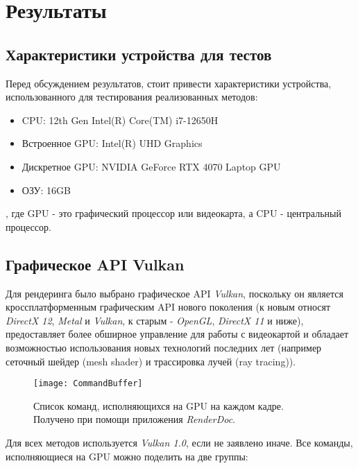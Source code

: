 
\section{Результаты}
\label{sec:Chapter4} 

\subsection{Характеристики устройства для тестов}

Перед обсуждением результатов, стоит привести характеристики устройства, использованного для тестирования реализованных методов:

\begin{itemize}
    \item CPU: 12th Gen Intel(R) Core(TM) i7-12650H
    \item Встроенное GPU: Intel(R) UHD Graphics
    \item Дискретное GPU: NVIDIA GeForce RTX 4070 Laptop GPU
    \item ОЗУ: 16GB
\end{itemize}
, где GPU - это графический процессор или видеокарта, а CPU - центральный процессор.

\subsection{Графическое API Vulkan}

Для рендеринга было выбрано графическое API \textit{Vulkan}, поскольку он является кроссплатформенным графическим API нового поколения (к новым относят \textit{DirectX 12}, \textit{Metal} и \textit{Vulkan}, к старым - \textit{OpenGL}, \textit{DirectX 11} и ниже), предоставляет более обширное управление для работы с видеокартой и обладает возможностью использования новых технологий последних лет (например сеточный шейдер (mesh shader) и трассировка лучей (ray tracing)).

\begin{figure}[h]
    \centering
    \texttt{[image: CommandBuffer]}
    \caption{Список команд, исполняющихся на GPU на каждом кадре. Получено при помощи приложения \textit{RenderDoc}.}
\end{figure}

Для всех методов используется \textit{Vulkan 1.0}, если не заявлено иначе. Все команды, исполняющиеся на GPU можно поделить на две группы:

